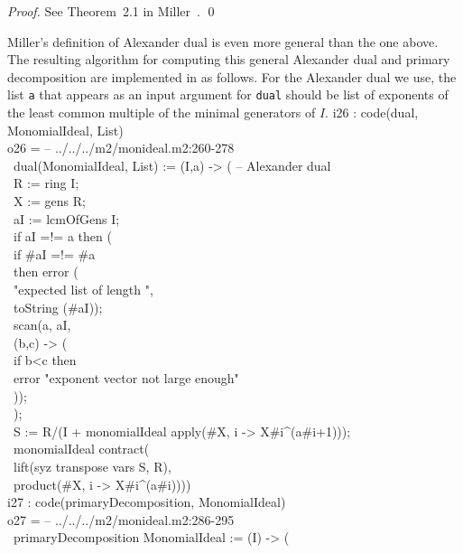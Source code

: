 \begin{proof}
See Theorem~2.1 in Miller~\cite{M}. \qed
\end{proof}

Miller's definition of Alexander dual is even more general than the one
above. The resulting algorithm for computing this general Alexander
dual and primary decomposition are implemented in \Mtwo as follows. 
For the Alexander dual we use, the list {\tt a} that appears
as an input argument for {\tt dual} should be list of exponents of
the least common multiple of the minimal generators of $I$.
\beginOutput
i26 : code(dual, MonomialIdeal, List)\\
\emptyLine
o26 = -- ../../../m2/monideal.m2:260-278\\
\      dual(MonomialIdeal, List) := (I,a) -> ( -- Alexander dual\\
\           R := ring I;\\
\           X := gens R;\\
\           aI := lcmOfGens I;\\
\           if aI =!= a then (\\
\                if #aI =!= #a \\
\                then error (\\
\                     "expected list of length ",\\
\                     toString (#aI));\\
\                scan(a, aI, \\
\                     (b,c) -> (\\
\                          if b<c then\\
\                          error "exponent vector not large enough"\\
\                          ));\\
\                ); \\
\           S := R/(I + monomialIdeal apply(#X, i -> X#i^(a#i+1)));\\
\           monomialIdeal contract(\\
\                lift(syz transpose vars S, R), \\
\                product(#X, i -> X#i^(a#i))))\\
\endOutput
\beginOutput
i27 : code(primaryDecomposition, MonomialIdeal)\\
\emptyLine
o27 = -- ../../../m2/monideal.m2:286-295\\
\      primaryDecomposition MonomialIdeal := (I) -> (\\
